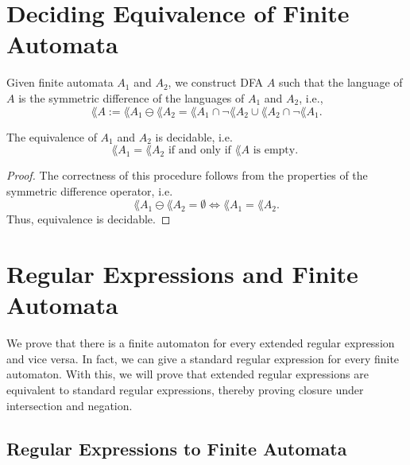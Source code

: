 \section{Deciding Equivalence of Finite Automata}
Given finite automata $A_1$ and $A_2$, we construct DFA $A$ such that the language of $A$ is the symmetric difference of the languages of $A_1$ and $A_2$, i.e.,
\begin{equation*}          
    \lang{A} := \lang{A_1} \ominus \lang{A_2} = \lang{A_1} \cap \neg \lang{A_2} \cup \lang{A_2} \cap \neg \lang{A_1}.      
\end{equation*}
\begin{theorem} The equivalence of $A_1$ and $A_2$ is decidable, i.e.
    \label{dfa_sym_diff_correct}
    \begin{equation*}                
        \lang{A_1} = \lang{A_2} \mbox{ if and only if } \lang{A} \mbox{ is empty. }                
    \end{equation*}
\end{theorem}
\begin{proof}
    The correctness of this procedure follows from the properties of the symmetric difference operator, i.e.
    \begin{equation*}                  
        \lang{A_1} \ominus \lang{A_2} = \emptyset \Leftrightarrow \lang{A_1} = \lang{A_2}.                  
    \end{equation*}
    Thus, equivalence is decidable.    
\end{proof}


\section{Regular Expressions and Finite Automata}

 
We prove that there is a finite automaton for every extended regular expression and vice versa. 
In fact, we can give a standard regular expression for every finite automaton.
With this, we will prove that extended regular expressions are equivalent to standard regular expressions, 
thereby proving closure under intersection and negation.


\subsection{Regular Expressions to Finite Automata}

